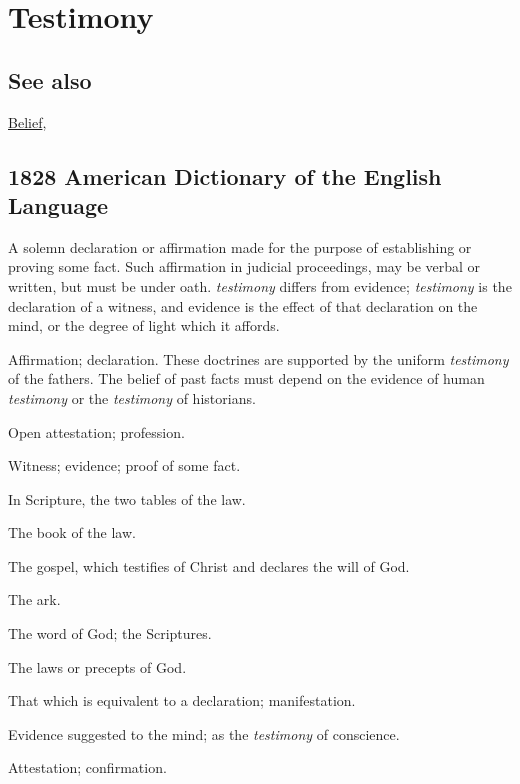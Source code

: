 \section{Testimony}
	\label{TESTIMONY}
	
\subsection{See also}

	\hyperref[BELIEF]{Belief},

\subsection{1828 American Dictionary of the English Language} %
	\label{TESTIMONY-1828}

	\begin{compactitem}
		\item A solemn declaration or affirmation made for the purpose of establishing or proving some fact. Such affirmation in judicial proceedings, may be verbal or written, but must be under oath. \textit{testimony} differs from evidence; \textit{testimony} is the declaration of a witness, and evidence is the effect of that declaration on the mind, or the degree of light which it affords.
		\item[1] Affirmation; declaration. These doctrines are supported by the uniform \textit{testimony} of the fathers. The belief of past facts must depend on the evidence of human \textit{testimony} or the \textit{testimony} of historians.
		\item[2] Open attestation; profession.
		\item[3] Witness; evidence; proof of some fact.
		\item[4] In Scripture, the two tables of the law.
		\item[5] The book of the law.
		\item[6] The gospel, which testifies of Christ and declares the will of God.
		\item[7] The ark.
		\item[8] The word of God; the Scriptures.
		\item[9] The laws or precepts of God.
		\item[10] That which is equivalent to a declaration; manifestation.
		\item[11] Evidence suggested to the mind; as the \textit{testimony} of conscience.
		\item[12] Attestation; confirmation.
	\end{compactitem}

